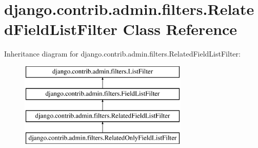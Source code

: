 \hypertarget{classdjango_1_1contrib_1_1admin_1_1filters_1_1_related_field_list_filter}{}\section{django.\+contrib.\+admin.\+filters.\+Related\+Field\+List\+Filter Class Reference}
\label{classdjango_1_1contrib_1_1admin_1_1filters_1_1_related_field_list_filter}
Inheritance diagram for django.\+contrib.\+admin.\+filters.\+Related\+Field\+List\+Filter\+:\begin{figure}[H]
\begin{center}
\leavevmode
\includegraphics[height=4.000000cm]{classdjango_1_1contrib_1_1admin_1_1filters_1_1_related_field_list_filter}
\end{center}
\end{figure}
